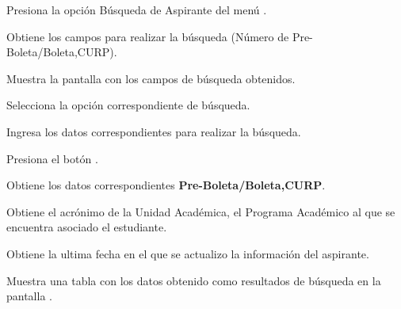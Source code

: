 \begin{UCtrayectoria}

\UCpaso [\UCactor] Presiona la opción Búsqueda de Aspirante del menú .

\UCpaso Obtiene los campos para realizar la búsqueda (Número de Pre-Boleta/Boleta,CURP).

\UCpaso Muestra la pantalla  con los campos de búsqueda obtenidos.

\UCpaso [\UCactor] Selecciona la opción correspondiente de búsqueda.

\UCpaso [\UCactor] Ingresa los datos correspondientes para realizar la búsqueda.

\UCpaso [\UCactor] Presiona el botón .

\UCpaso Obtiene los datos correspondientes \textbf{Pre-Boleta/Boleta,CURP}. 
	
\UCpaso Obtiene el acrónimo de la Unidad Académica, el Programa Académico al que se encuentra asociado el estudiante. 

\UCpaso Obtiene la ultima fecha en el que se actualizo la información del aspirante.

\UCpaso Muestra una tabla con los datos obtenido como resultados de búsqueda en la pantalla  .

\end{UCtrayectoria}



